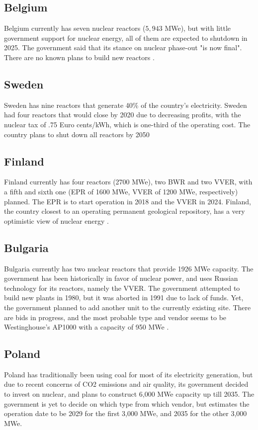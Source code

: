 \subsection{Belgium}
Belgium currently has seven nuclear reactors ($5,943$ MWe), but with little government support
for nuclear energy, all of them are expected to shutdown in 2025. The government
said that its stance on nuclear phase-out "is now final". There are no known plans
to build new reactors \cite{noauthor_nuclear_2017-4}.

\subsection{Sweden}
Sweden has nine reactors that generate 40\% of the country's electricity. 
Sweden had four reactors that would close by 2020 due to decreasing profits,
with the nuclear tax of .75 Euro cents/kWh, which is one-third of the operating
cost. The country plans to shut down all reactors by 2050 \cite{noauthor_nuclear_2017-5}

\subsection{Finland}
Finland currently has four reactors (2700 MWe), two BWR and two VVER,
with a fifth and sixth one (EPR of 1600 MWe, VVER of 1200 MWe, respectively) planned.
The EPR is to start operation in 2018 and the VVER in 2024.
Finland, the country closest to an operating permanent geological repository, has 
a very optimistic view of nuclear energy \cite{noauthor_nuclear_2017-6}.

\subsection{Bulgaria}
Bulgaria currently has two nuclear reactors that provide 1926 MWe capacity. The
government has been historically in favor of nuclear power, and uses Russian
technology for its reactors, namely the VVER. The government attempted to build
new plants in 1980, but it was aborted in 1991 due to lack of funds. Yet,
the government planned to add another unit to the currently existing site.
There are bids in progress, and the most probable type and vendor seems to be
Westinghouse's AP1000 with a capacity of 950 MWe \cite{noauthor_nuclear_2016}.


\subsection{Poland}
Poland has traditionally been using coal for most of its electricity generation,
but due to recent concerns of CO2 emissions and air quality, its government decided
to invest on nuclear, and plans to construct 6,000 MWe capacity up till 2035. The government
is yet to decide on which type from which vendor, but estimates the operation date to be
2029 for the first 3,000 MWe, and 2035 for the other 3,000 MWe. \cite{noauthor_nuclear_2017-7}

